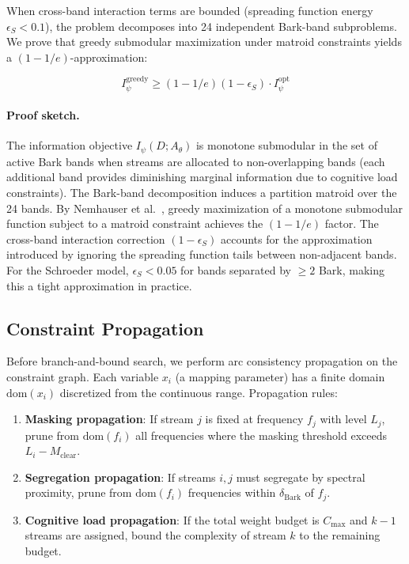 \documentclass[sigchi, nonacm]{acmart}
\begin{document}
When cross-band interaction terms are bounded (spreading function energy $\epsilon_S < 0.1$), the problem decomposes into 24 independent Bark-band subproblems. We prove that greedy submodular maximization under matroid constraints yields a $(1-1/e)$-approximation:

\begin{equation}
I_\psi^\mathrm{greedy} \geq (1 - 1/e)(1 - \epsilon_S) \cdot I_\psi^\mathrm{opt}
\end{equation}

\paragraph{Proof sketch.} The information objective $I_\psi(D; A_\theta)$ is monotone submodular in the set of active Bark bands when streams are allocated to non-overlapping bands (each additional band provides diminishing marginal information due to cognitive load constraints). The Bark-band decomposition induces a partition matroid over the 24 bands. By Nemhauser et al.~\cite{nemhauser1978analysis}, greedy maximization of a monotone submodular function subject to a matroid constraint achieves the $(1-1/e)$ factor. The cross-band interaction correction $(1-\epsilon_S)$ accounts for the approximation introduced by ignoring the spreading function tails between non-adjacent bands. For the Schroeder model, $\epsilon_S < 0.05$ for bands separated by $\geq 2$ Bark, making this a tight approximation in practice.

\subsection{Constraint Propagation}

Before branch-and-bound search, we perform arc consistency propagation on the constraint graph. Each variable $x_i$ (a mapping parameter) has a finite domain $\mathrm{dom}(x_i)$ discretized from the continuous range. Propagation rules:

\begin{enumerate}
    \item \textbf{Masking propagation}: If stream $j$ is fixed at frequency $f_j$ with level $L_j$, prune from $\mathrm{dom}(f_i)$ all frequencies where the masking threshold exceeds $L_i - M_\mathrm{clear}$.
    \item \textbf{Segregation propagation}: If streams $i,j$ must segregate by spectral proximity, prune from $\mathrm{dom}(f_i)$ frequencies within $\delta_\mathrm{Bark}$ of $f_j$.
    \item \textbf{Cognitive load propagation}: If the total weight budget is $C_\mathrm{max}$ and $k-1$ streams are assigned, bound the complexity of stream $k$ to the remaining budget.
\end{enumerate}
\end{document}
